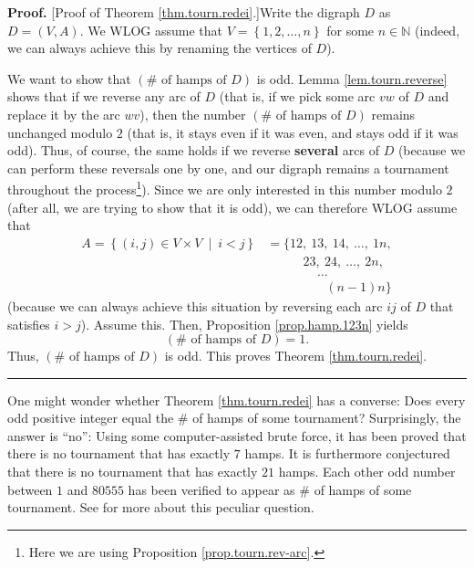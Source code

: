 \documentclass[numbers=enddot,12pt,final,onecolumn,notitlepage]{scrartcl}%
\numberwithin{exer}{subsection}
\theoremstyle{definition}
\newenvironment{proof}[1][Proof]{\noindent\textbf{#1.} }{\ \rule{0.5em}{0.5em}}
\begin{document}
\begin{proof}
[Proof of Theorem \ref{thm.tourn.redei}.]Write the digraph $D$ as $D=\left(
V,A\right)  $. We WLOG assume that $V=\left\{  1,2,\ldots,n\right\}  $ for
some $n\in\mathbb{N}$ (indeed, we can always achieve this by renaming the
vertices of $D$).

We want to show that $\left(  \#\text{ of hamps of }D\right)  $ is odd. Lemma
\ref{lem.tourn.reverse} shows that if we reverse any arc of $D$ (that is, if
we pick some arc $vw$ of $D$ and replace it by the arc $wv$), then the number
$\left(  \#\text{ of hamps of }D\right)  $ remains unchanged modulo $2$ (that
is, it stays even if it was even, and stays odd if it was odd). Thus, of
course, the same holds if we reverse \textbf{several} arcs of $D$ (because we
can perform these reversals one by one, and our digraph remains a tournament
throughout the process\footnote{Here we are using Proposition
\ref{prop.tourn.rev-arc}.}). Since we are only interested in this number
modulo $2$ (after all, we are trying to show that it is odd), we can therefore
WLOG assume that%
\begin{align*}
A=\left\{  \left(  i,j\right)  \in V\times V\ \mid\ i<j\right\}   &
=\{12,\ 13,\ 14,\ \ldots,\ 1n,\\
&  \ \ \ \ \ \ \ \ \ \ \ \ \ 23,\ 24,\ \ldots,\ 2n,\\
&  \ \ \ \ \ \ \ \ \ \ \ \ \ \ \ \ \ \ \ldots\\
&  \ \ \ \ \ \ \ \ \ \ \ \ \ \ \ \ \ \ \ \ \ \left(  n-1\right)  n\}
\end{align*}
(because we can always achieve this situation by reversing each arc $ij$ of
$D$ that satisfies $i>j$). Assume this. Then, Proposition \ref{prop.hamp.123n}
yields%
\[
\left(  \#\text{ of hamps of }D\right)  =1.
\]
Thus, $\left(  \#\text{ of hamps of }D\right)  $ is odd. This proves Theorem
\ref{thm.tourn.redei}.
\end{proof}

One might wonder whether Theorem \ref{thm.tourn.redei} has a converse: Does
every odd positive integer equal the $\#$ of hamps of some tournament?
Surprisingly, the answer is \textquotedblleft no\textquotedblright: Using some
computer-assisted brute force, it has been proved that there is no tournament
that has exactly $7$ hamps. It is furthermore conjectured that there is no
tournament that has exactly $21$ hamps. Each other odd number between $1$ and
$80555$ has been verified to appear as $\#$ of hamps of some tournament. See
\cite{MO232751} for more about this peculiar question.
\end{document}
